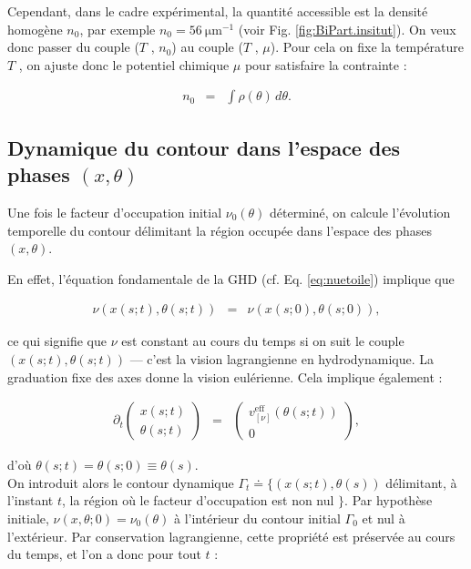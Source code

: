 Cependant, dans le cadre expérimental, la quantité accessible est la densité homogène $n_0$, par exemple $n_0 = 56~\mathrm{\mu m^{-1}}$ (voir Fig. \ref{fig:BiPart.insitut}). On veux donc passer du couple ($T$ , $n_0$) au couple ($T$ , $\mu$). Pour cela on fixe la température $T$ , on ajuste donc le potentiel chimique $\mu$ pour satisfaire la contrainte :

\begin{eqnarray*}
	n_0 & = & \int \rho(\theta) \, d\theta.
\end{eqnarray*}

\subsection{Dynamique du contour dans l’espace des phases $(x, \theta)$}

Une fois le facteur d’occupation initial $\nu_0(\theta)$ déterminé, on calcule l’évolution temporelle du contour délimitant la région occupée dans l’espace des phases $(x, \theta)$. 

En effet, l’équation fondamentale de la GHD (cf. Eq. \ref{eq:nuetoile}) implique que

\begin{eqnarray*}
	\nu(x(s;t), \theta(s;t)) & = & \nu(x(s;0), \theta(s;0)),
\end{eqnarray*}

ce qui signifie que $\nu$ est constant au cours du temps si on suit le couple $(x(s;t), \theta(s;t))$ — c’est la vision lagrangienne en hydrodynamique. La graduation fixe des axes donne la vision eulérienne. Cela implique également :

\begin{eqnarray*}
	\partial_t \left( \begin{array}{c} x(s;t) \\ \theta(s;t) \end{array} \right) & = & \left( \begin{array}{c} v^{\mathrm{eff}}_{[\nu]}(\theta(s;t)) \\ 0 \end{array} \right),
\end{eqnarray*}

d’où $\theta(s;t) = \theta(s;0) \equiv \theta(s)$.\\
On introduit alors le contour dynamique $\Gamma_t \doteq \{(x(s;t), \theta(s))$ délimitant, à l’instant $t$, la région où le facteur d’occupation est non nul $\}$. Par hypothèse initiale, $\nu(x, \theta; 0) = \nu_0(\theta)$ à l’intérieur du contour initial $\Gamma_0$ et nul à l’extérieur. Par conservation lagrangienne, cette propriété est préservée au cours du temps, et l’on a donc pour tout $t$ :

